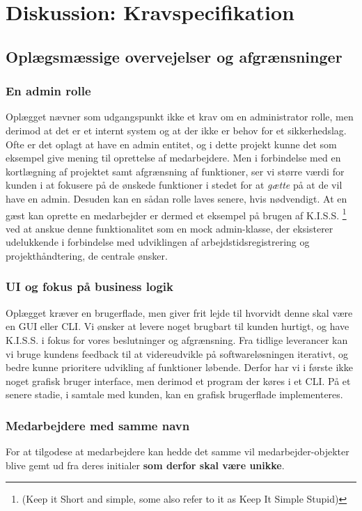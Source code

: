 \section{Diskussion: Kravspecifikation}
\subsection{Oplægsmæssige overvejelser og afgrænsninger}
\subsubsection{En admin rolle}
Oplægget nævner som udgangspunkt ikke et krav om en administrator rolle, men derimod at det er et internt system og at der ikke er behov for et sikkerhedslag. Ofte er det oplagt at have en admin entitet, og i dette projekt kunne det som eksempel give mening til oprettelse af medarbejdere. Men i forbindelse med en kortlægning af projektet samt afgrænsning af funktioner, ser vi større værdi for kunden i at fokusere på de ønskede funktioner i stedet for at \textit{gætte} på at de vil have en admin. Desuden kan en sådan rolle laves senere, hvis nødvendigt. At en gæst kan oprette en medarbejder er dermed et eksempel på brugen af K.I.S.S. \footnote{(Keep it Short and simple, some also refer to it as Keep It Simple Stupid)} ved at anskue denne funktionalitet som en mock admin-klasse, der eksisterer udelukkende i forbindelse med udviklingen af arbejdstidsregistrering og projekthåndtering, de centrale ønsker.
\subsubsection{UI og fokus på business logik}
Oplægget kræver en brugerflade, men giver frit lejde til hvorvidt denne skal være en GUI eller CLI. Vi ønsker at levere noget brugbart til kunden hurtigt, og have K.I.S.S. i fokus for vores beslutninger og afgrænsning. Fra tidlige leverancer kan vi bruge kundens feedback til at videreudvikle på softwareløsningen iterativt, og bedre kunne prioritere udvikling af funktioner løbende. Derfor har vi i første ikke noget grafisk bruger interface, men derimod et program der køres i et CLI. På et senere stadie, i samtale med kunden, kan en grafisk brugerflade implementeres.
\subsubsection{Medarbejdere med samme navn}
For at tilgodese at medarbejdere kan hedde det samme vil medarbejder-objekter blive gemt ud fra deres initialer \textbf{som derfor skal være unikke}.
